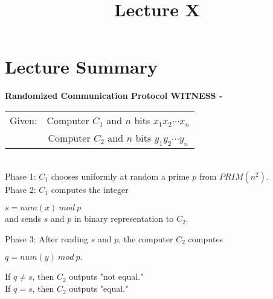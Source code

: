 \documentclass[a4paper]{article}
\title{\vspace{-2cm}Lecture X\vspace{-2cm}}
\date{}
\begin{document}
\maketitle
\section{Lecture Summary}
\begin{algorithm}
\textbf{Randomized Communication Protocol WITNESS -} \\
\begin{tabular}{c c}
Given: & Computer $C_{1}$ and $n$ bits $x_{1}x_{2}\cdots x_{n}$ \\
& Computer $C_{2}$ and $n$ bits $y_{1}y_{2}\cdots y_{n}$
\end{tabular} \\
Phase 1: $C_{1}$ chooses uniformly at random a prime $p$ from $PRIM(n^{2})$. \\
Phase 2: $C_{1}$ computes the integer
\begin{center}
$s = num(x)\ mod\ p$ \\
and sends $s$ and $p$ in binary representation to $C_{2}$.
\end{center}
Phase 3: After reading $s$ and $p$, the computer $C_{2}$ computes
\begin{center}
$q = num(y)\ mod\ p.$
\end{center}
If $q \neq s$, then $C_{2}$ outputs "not equal." \\
If $q = s$, then $C_{2}$ outputs "equal."
\end{algorithm}
\end{document}
